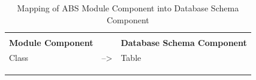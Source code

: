 \documentclass[runningheads,a4paper]{llncs}
\begin{document}
\begin{table}[]
	\centering
	\caption{Mapping of ABS Module Component into Database Schema Component}
	\label{my-label}
	\begin{tabular}{|l|l|l|}
		\hline
		\multicolumn{1}{|c|}{\cellcolor[HTML]{C0C0C0}}                                                   & \multicolumn{1}{c|}{\cellcolor[HTML]{C0C0C0}}                                                                               & \multicolumn{1}{c|}{\cellcolor[HTML]{C0C0C0}}                                                                                                      \\
		\multicolumn{1}{|c|}{\multirow{-2}{*}{\cellcolor[HTML]{C0C0C0}\textbf{Module Component}}}        & \multicolumn{1}{c|}{\multirow{-2}{*}{\cellcolor[HTML]{C0C0C0}\textbf{}}}                                                    & \multicolumn{1}{c|}{\multirow{-2}{*}{\cellcolor[HTML]{C0C0C0}\textbf{Database Schema Component}}}                                                  \\ \hline
		Class                                                                                            & --\textgreater                                                                                                              & Table                                                                                                                                              \\ \hline
		&                                                                                                                             &                                                                                                                                                    \\
		&                                                                                                                             &                                                                                                                                                    \\
		&                                                                                                                             &                                                                                                                                                    \\

\end{tabular}
\end{table}
\end{document}
